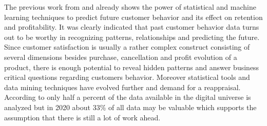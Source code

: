 The previous work from \cite{mozer2000predicting} and \cite{lariviere2005predicting} already shows the power of statistical and machine learning techniques to predict future customer behavior and its effect on retention and profitability. It was clearly indicated that past customer behavior data turns out to be worthy in recognizing patterns, relationships and predicting the future. Since customer satisfaction is usually a rather complex construct consisting of several dimensions besides purchase, cancellation and profit evolution of a product, there is enough potential to reveal hidden patterns and answer business critical questions regarding customers behavior. Moreover statistical tools and data mining techniques have evolved further and demand for a reappraisal. According to \cite{gantz2012digital} only half a percent of the data available in the digital universe is analyzed but in 2020 about 33\% of all data may be valuable which supports the assumption that there is still a lot of work ahead. 




